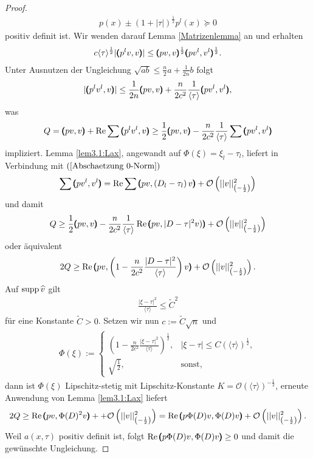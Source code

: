 \begin{proof}
\begin{align}
	p(x) \pm (1+| \tau|)^{\frac{1}{2}}p^l(x) \succeq 0
\end{align}
positiv definit ist. Wir wenden darauf Lemma \ref{Matrizenlemma} an und erhalten
\begin{align}
	c\langle\tau\rangle^{\frac{1}{2}} |\pmb(p^lv,v\pmb)|\le\pmb(pv,v\pmb)^{\frac{1}{2}}\pmb(pv^l,v^l\pmb)^{\frac{1}{2}}.
\end{align}
Unter Ausnutzen der Ungleichung $\sqrt{ab}\le \frac{n}{2}a+\frac{1}{2n}b$ folgt
\begin{align}
	|\pmb(p^lv^l,v\pmb)|\le \frac{1}{2n}\pmb(pv,v\pmb)+\frac{n}{2c^2}\frac{1}{\langle\tau\rangle}\pmb(pv^l,v^l\pmb),
\end{align}
was 
\begin{align}
	Q=\pmb(pv,v\pmb)+\operatorname{Re}\sum\pmb(p^lv^l,v\pmb) \ge \frac{1}{2}\pmb(pv,v\pmb) -\frac{n}{2c^2}\frac{1}{\langle\tau\rangle}\sum\pmb(pv^l,v^l\pmb)
\end{align}
impliziert. Lemma \ref{lem3.1:Lax}, angewandt auf $\Phi(\xi) = \xi_l-\tau_l$, liefert in Verbindung mit $(\ref{Abschaetzung 0-Norm})$
\begin{align}
\sum\pmb(pv^l,v^l\pmb)=\operatorname{Re}\sum \pmb(pv,\left(D_l-\tau_l\right)v\pmb)+\mathcal{O}\left(|| v||_{\left(-\frac{1}{2}\right)}^2\right) 
\end{align}
und damit
\begin{align}
	Q \ge \frac{1}{2}\pmb(pv,v\pmb)-\frac{n}{2c^2}\frac{1}{\langle\tau\rangle}\operatorname{Re}\pmb(pv,| D-\tau|^2v)\pmb)+\mathcal{O}\left(|| v||_{\left(-\frac{1}{2}\right)}^2\right)
\end{align}
oder äquivalent
\begin{align}
	2Q \ge \operatorname{Re}\pmb(pv,\left(1-\frac{n}{2c^2}\frac{| D-\tau|^2}{\langle\tau\rangle}\right)v\pmb)+\mathcal{O}\left(|| v||_{\left(-\frac{1}{2}\right)}^2\right).
\end{align}
Auf $\operatorname{supp}\widehat{v}$ gilt
\begin{align}
	\frac{|\xi-\tau|^2}{\langle\tau\rangle}\le \tilde{C}^2 
\end{align}
für eine Konstante $\tilde{C}>0$. Setzen wir nun $c:=\tilde{C}\sqrt{n}$ und 
\begin{align}
	\Phi(\xi):=\begin{cases}
		\left(1-\frac{n}{2c^2}\frac{| \xi-\tau|^2}{\langle\tau\rangle}\right)^{\frac{1}{2}}, &| \xi-\tau| \le C(\langle\tau\rangle)^{\frac{1}{2}},\\
		\sqrt{\frac{1}{2}}, & \text{sonst},
	\end{cases}
\end{align}
dann ist $\Phi(\xi)$ Lipschitz-stetig mit Lipschitz-Konstante $K=\mathcal O(\langle\tau\rangle)^{-\frac{1}{2}}$, erneute Anwendung von Lemma \ref{lem3.1:Lax} liefert
\begin{align}
	2Q \ge \operatorname{Re}\pmb(pv,\Phi(D)^2v\pmb)++\mathcal{O}\left(|| v||_{\left(-\frac{1}{2}\right)}^2\right) = \operatorname{Re}\pmb(p\Phi(D)v,\Phi(D)v\pmb)+\mathcal{O}\left(|| v||_{\left(-\frac{1}{2}\right)}^2\right).
\end{align}
Weil $a(x,\tau)$ positiv definit ist, folgt $\operatorname{Re}\pmb(p\Phi(D)v,\Phi(D)v\pmb)\ge 0$ und damit die gewünschte Ungleichung. 
\end{proof}

